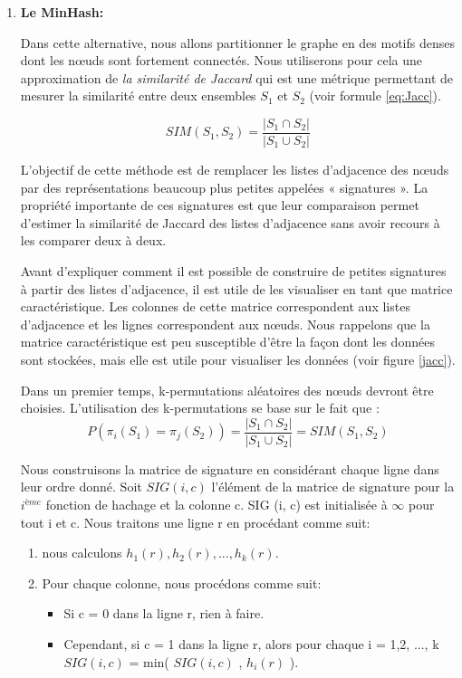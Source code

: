\documentclass[a4paper,oneside,12pt]{report}
\theoremstyle{definition}
\begin{document}
\begin{enumerate}
\item \textbf{Le MinHash:}

Dans cette alternative, nous allons partitionner le graphe en des motifs denses dont les nœuds sont fortement connectés. Nous utiliserons pour cela une approximation de \textit{la similarité de Jaccard} qui est une métrique permettant de mesurer la similarité entre deux ensembles $S_1$ et $S_2$ (voir formule \ref{eq:Jacc}). 

\begin{equation} \label{eq:Jacc}
SIM(S_1,S_2)=\frac{|S_1 \cap S_2|}{|S_1 \cup S_2|}
\end{equation}


L'objectif de cette méthode est de remplacer les listes d'adjacence des nœuds par des représentations beaucoup plus petites appelées « signatures ». La propriété importante de ces signatures est que leur comparaison permet d'estimer la similarité de Jaccard des listes d'adjacence sans avoir recours à les comparer deux à deux. 

Avant d'expliquer comment il est possible de construire de petites signatures à partir des listes d'adjacence, il est utile de les visualiser en tant que matrice caractéristique. Les colonnes de cette matrice correspondent aux listes d'adjacence et les lignes correspondent aux nœuds. Nous rappelons que la matrice caractéristique est peu susceptible d'être la façon dont les données sont stockées, mais elle est utile pour visualiser les données (voir figure \ref{jacc}). 


Dans un premier temps, k-permutations aléatoires des nœuds devront être choisies. L'utilisation des k-permutations se base sur le fait que :
\begin{equation} \label{eq:prob}
P(\pi_i(S_1) = \pi_j(S_2)) = \frac{|S_1 \cap S_2|}{|S_1 \cup S_2|} = SIM(S_1,S_2)
\end{equation}

 Nous construisons la matrice de signature en considérant chaque ligne dans leur ordre donné. Soit $SIG (i, c)$ l'élément de la matrice de signature pour la $i^{ème}$ fonction de hachage et la colonne c. SIG (i, c) est initialisée à $\infty$ pour tout i et c. Nous traitons une ligne r en procédant comme suit:
\begin{enumerate}
\item nous calculons $h_1 (r), h_2 (r), ..., h_k (r)$.
\item Pour chaque colonne, nous procédons comme suit: 
	\begin{itemize}
		\item  Si c = 0 dans la ligne r, rien à faire.
		\item  Cependant, si c = 1 dans la ligne r, alors pour chaque i = 1,2, ..., k  \\$SIG (i, c)$ = min( $SIG (i, c)$ , $h_i(r)$ ).
	\end{itemize}
\end{enumerate}





\end{enumerate}
\end{document}
